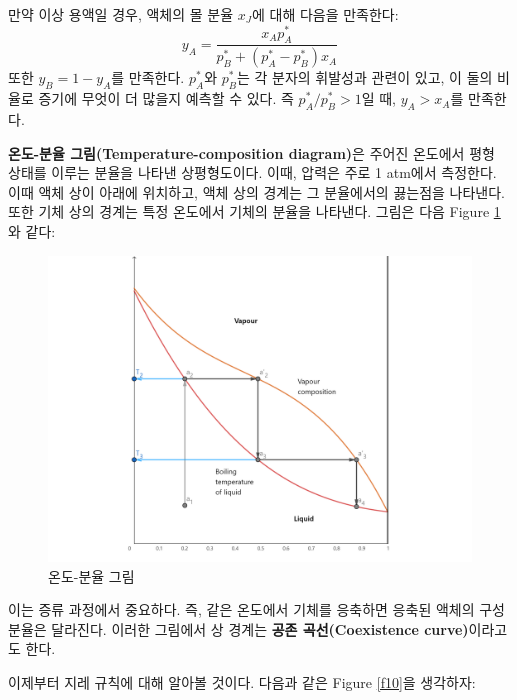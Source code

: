         만약 이상 용액일 경우, 액체의 몰 분율 $x_J$에 대해 다음을 만족한다:
        \begin{equation*}
            y_A = \frac{x_A p_A^\ast}{p_B^\ast + \left(p_A^\ast - p_B^\ast\right)x_A}
        \end{equation*}
        또한 $y_B = 1-y_A$를 만족한다. $p_A^\ast$와 $p_B^\ast$는 각 분자의 휘발성과 관련이 있고, 이 둘의 비율로 증기에 
        무엇이 더 많을지 예측할 수 있다. 즉 $p_A^\ast / p_B^\ast > 1$일 때, $y_A > x_A$를 만족한다.
        \par \textbf{온도-분율 그림(Temperature-composition diagram)}은 주어진 온도에서 평형 상태를 이루는 분율을 나타낸 상평형도이다. 
        이때, 압력은 주로 1 atm에서 측정한다. 이때 액체 상이 아래에 위치하고, 액체 상의 경계는 그 분율에서의 끓는점을 나타낸다. 또한 
        기체 상의 경계는 특정 온도에서 기체의 분율을 나타낸다. 그림은 다음 Figure \ref{f9}와 같다:\\
        \begin{figure}[H]
            \centering
            \includegraphics[scale=8]{Images/lgphasediag}
            \caption{온도-분율 그림}\label{f9}
        \end{figure}
        이는 증류 과정에서 중요하다. 즉, 같은 온도에서 기체를 응축하면 응축된 액체의 구성 분율은 달라진다. 이러한 그림에서 
        상 경계는 \textbf{공존 곡선(Coexistence curve)}이라고도 한다.
        \par 이제부터 지레 규칙에 대해 알아볼 것이다. 다음과 같은 Figure \ref{f10}을 생각하자:

